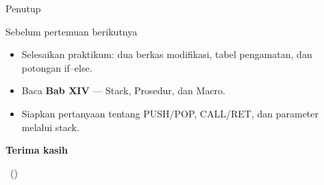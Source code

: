 \documentclass[aspectratio=169,11pt]{beamer}
\begin{document}
\begin{frame}{Penutup}
\begin{block}{Sebelum pertemuan berikutnya}
\small
\begin{itemize}
    \item Selesaikan praktikum: dua berkas  modifikasi,
          tabel pengamatan, dan potongan if--else.
    \item Baca \textbf{Bab XIV} — Stack, Prosedur, dan Macro.
    \item Siapkan pertanyaan tentang PUSH/POP, CALL/RET, dan
          parameter melalui stack.
\end{itemize}
\end{block}

\vspace{0.4em}
\begin{center}
{\color{obeBlue}\sffamily\large\bfseries Terima kasih\par}
\vspace{0.15em}
{\color{obeGray}\sffamily\small \NamaMK\ (\KodeMK)
\textbullet\ \SemesterTeks\par}
\end{center}
\end{frame}
\end{document}
